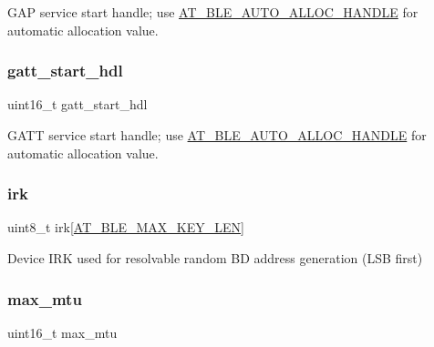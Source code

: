 G\+AP service start handle; use \mbox{\hyperlink{at__ble__api_8h_a006780a0fa215bc901071f44a732758e}{A\+T\+\_\+\+B\+L\+E\+\_\+\+A\+U\+T\+O\+\_\+\+A\+L\+L\+O\+C\+\_\+\+H\+A\+N\+D\+LE}} for automatic allocation value. 

\mbox{\label{structat__ble__dev__config__t_a92bcdddc063e1c24d0edee9abcdfeea7}} 
\subsubsection{\texorpdfstring{gatt\_start\_hdl}{gatt\_start\_hdl}}
{\footnotesize\ttfamily uint16\+\_\+t gatt\+\_\+start\+\_\+hdl}



G\+A\+TT service start handle; use \mbox{\hyperlink{at__ble__api_8h_a006780a0fa215bc901071f44a732758e}{A\+T\+\_\+\+B\+L\+E\+\_\+\+A\+U\+T\+O\+\_\+\+A\+L\+L\+O\+C\+\_\+\+H\+A\+N\+D\+LE}} for automatic allocation value. 

\mbox{\label{structat__ble__dev__config__t_a6976ea27c8e6eefa6ee513454dad7faa}} 
\subsubsection{\texorpdfstring{irk}{irk}}
{\footnotesize\ttfamily uint8\+\_\+t irk\mbox{[}\mbox{\hyperlink{at__ble__api_8h_a462eb50567c44d7284308fe058158e99}{A\+T\+\_\+\+B\+L\+E\+\_\+\+M\+A\+X\+\_\+\+K\+E\+Y\+\_\+\+L\+EN}}\mbox{]}}



Device I\+RK used for resolvable random BD address generation (L\+SB first) 

\mbox{\label{structat__ble__dev__config__t_a51f85ee7f22451fd162c6db42979cf36}} 
\subsubsection{\texorpdfstring{max\_mtu}{max\_mtu}}
{\footnotesize\ttfamily uint16\+\_\+t max\+\_\+mtu}



